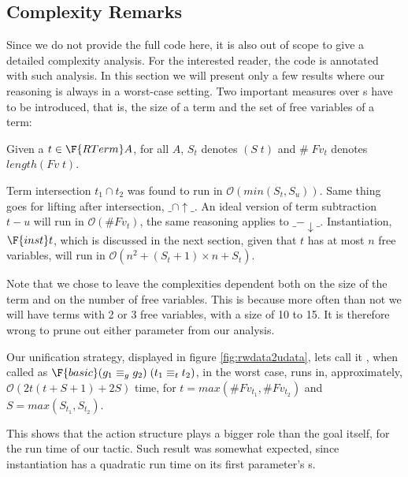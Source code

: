 \subsection{Complexity Remarks}
\label{sec:basiccomplexity}

Since we do not provide the full code here, it is also out of 
scope to give a detailed complexity analysis. For the interested reader, the 
code is annotated with such analysis. In this section we will present only a 
few results where our reasoning is always in a worst-case setting.
Two important measures over s have to be introduced, that is,
the size of a term and the set of free variables of a term:

\newcommand{\bigO}[1]{\mathcal{O}(#1)}
\begin{minipage}[t]{0.45\textwidth}
\end{minipage}
\begin{minipage}[t]{0.45\textwidth}
\end{minipage}

Given a $t \in \F{RTerm} A$, for all $A$, $S_t$ denotes $(S\; t)$ and 
$\#\;Fv_t$ denotes $length (Fv\;t)$. 

Term intersection $t_1 \cap t_2$ was found to run in $\bigO{min(S_t, S_u)}$.
Same thing goes for lifting after intersection, $\_\cap\uparrow\_$. 
An ideal version of term subtraction $t - u$ will run in $\bigO{\# Fv_t}$,
the same reasoning applies to $\_-\downarrow\_$.
Instantiation, $\F{inst }t$, which is discussed in the next section, given
that $t$ has at most $n$ free variables, will run in 
$\bigO{n^2 + (S_t + 1)\times n + S_t}$.

Note that we chose to leave the complexities dependent both on the size of the term
and on the number of free variables. This is because more often than not we will have
terms with 2 or 3 free variables, with a size of 10 to 15. It is therefore wrong
to prune out either parameter from our analysis.

Our unification strategy, displayed in figure \ref{fig:rwdata2udata}, lets call
it , when called as $\F{basic }(g_1 \equiv_g g_2)\;(t_1 \equiv_t t_2)$,
in the worst case, runs in, approximately, $\bigO{2t(t + S + 1) + 2S}$ time, for $t = max(\#Fv_{t_1}, \#Fv_{t_2})$ and
$S = max(S_{t_1}, S_{t_2})$.

This shows that the action structure plays a bigger role than the goal itself,
for the run time of our tactic. Such result was somewhat expected, since instantiation
has a quadratic run time on its first parameter's s. 

